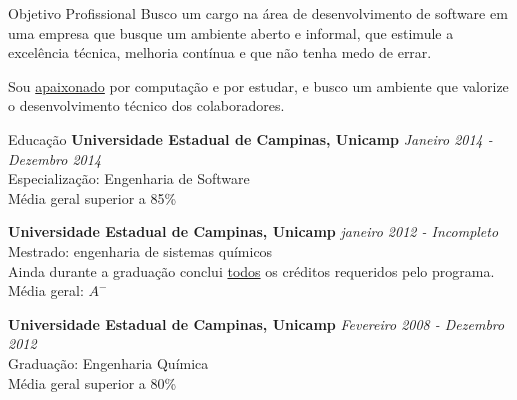 \documentclass{resume} %
\begin{document}
\begin{rSection}{Objetivo Profissional}
  Busco um cargo na área de desenvolvimento de software em uma empresa que
  busque um ambiente aberto e informal, que estimule a excelência técnica,
  melhoria contínua e que não tenha medo de errar.

  Sou \underline{apaixonado} por computação e por estudar, e busco um ambiente
  que valorize o desenvolvimento técnico dos colaboradores.
\end{rSection}

\begin{rSection}{Educação}
  {\bf Universidade Estadual de Campinas, Unicamp} \hfill {\em Janeiro 2014 - Dezembro 2014} \\
  Especialização: Engenharia de Software \\
  Média geral superior a 85\%

  {\bf Universidade Estadual de Campinas, Unicamp} \hfill {\em janeiro 2012 - Incompleto} \\
  Mestrado: engenharia de sistemas químicos \\
  Ainda durante a graduação conclui \underline{todos} os créditos requeridos
  pelo programa. \\
  Média geral: $A^-$

  {\bf Universidade Estadual de Campinas, Unicamp} \hfill {\em Fevereiro 2008 - Dezembro 2012} \\
  Graduação: Engenharia Química \\
  Média geral superior a 80\%
\end{rSection}
\end{document}

